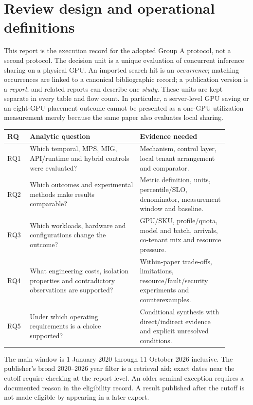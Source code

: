 \section{Review design and operational definitions}
\label{sec:review-design}
This report is the execution record for the adopted Group A protocol, not a second protocol. The decision unit is a unique evaluation of concurrent inference sharing on a physical GPU. An imported search hit is an \emph{occurrence}; matching occurrences are linked to a canonical bibliographic record; a publication version is a \emph{report}; and related reports can describe one \emph{study}. These units are kept separate in every table and flow count. In particular, a server-level GPU saving or an eight-GPU placement outcome cannot be presented as a one-GPU utilization measurement merely because the same paper also evaluates local sharing.

\begin{longtable}{P{0.09\linewidth}P{0.45\linewidth}P{0.36\linewidth}}
\toprule RQ & Analytic question & Evidence needed\\\midrule\endhead
RQ1 & Which temporal, MPS, MIG, API/runtime and hybrid controls were evaluated? & Mechanism, control layer, local tenant arrangement and comparator.\\
RQ2 & Which outcomes and experimental methods make results comparable? & Metric definition, units, percentile/SLO, denominator, measurement window and baseline.\\
RQ3 & Which workloads, hardware and configurations change the outcome? & GPU/SKU, profile/quota, model and batch, arrivals, co-tenant mix and resource pressure.\\
RQ4 & What engineering costs, isolation properties and contradictory observations are supported? & Within-paper trade-offs, limitations, resource/fault/security experiments and counterexamples.\\
RQ5 & Under which operating requirements is a choice supported? & Conditional synthesis with direct/indirect evidence and explicit unresolved conditions.\\
\bottomrule\end{longtable}

The main window is 1 January 2020 through 11 October 2026 inclusive. The publisher's broad 2020--2026 year filter is a retrieval aid; exact dates near the cutoff require checking at the report level. An older seminal exception requires a documented reason in the eligibility record. A result published after the cutoff is not made eligible by appearing in a later export. 

